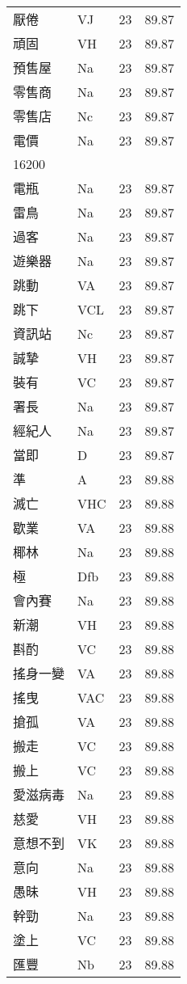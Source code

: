 \documentclass[twocolumn]{book}
\begin{document}
\begin{supertabular}{llrr}
厭倦 & VJ & 23 &  89.87\\
頑固 & VH & 23 &  89.87\\
預售屋 & Na & 23 &  89.87\\
零售商 & Na & 23 &  89.87\\
零售店 & Nc & 23 &  89.87\\
電價 & Na & 23 &  89.87\\
16200\\
電瓶 & Na & 23 &  89.87\\
雷鳥 & Na & 23 &  89.87\\
過客 & Na & 23 &  89.87\\
遊樂器 & Na & 23 &  89.87\\
跳動 & VA & 23 &  89.87\\
跳下 & VCL & 23 &  89.87\\
資訊站 & Nc & 23 &  89.87\\
誠摯 & VH & 23 &  89.87\\
裝有 & VC & 23 &  89.87\\
署長 & Na & 23 &  89.87\\
經紀人 & Na & 23 &  89.87\\
當即 & D & 23 &  89.87\\
準 & A & 23 &  89.88\\
滅亡 & VHC & 23 &  89.88\\
歇業 & VA & 23 &  89.88\\
椰林 & Na & 23 &  89.88\\
極 & Dfb & 23 &  89.88\\
會內賽 & Na & 23 &  89.88\\
新潮 & VH & 23 &  89.88\\
斟酌 & VC & 23 &  89.88\\
搖身一變 & VA & 23 &  89.88\\
搖曳 & VAC & 23 &  89.88\\
搶孤 & VA & 23 &  89.88\\
搬走 & VC & 23 &  89.88\\
搬上 & VC & 23 &  89.88\\
愛滋病毒 & Na & 23 &  89.88\\
慈愛 & VH & 23 &  89.88\\
意想不到 & VK & 23 &  89.88\\
意向 & Na & 23 &  89.88\\
愚昧 & VH & 23 &  89.88\\
幹勁 & Na & 23 &  89.88\\
塗上 & VC & 23 &  89.88\\
匯豐 & Nb & 23 &  89.88\\

\end{supertabular}
\end{document}
